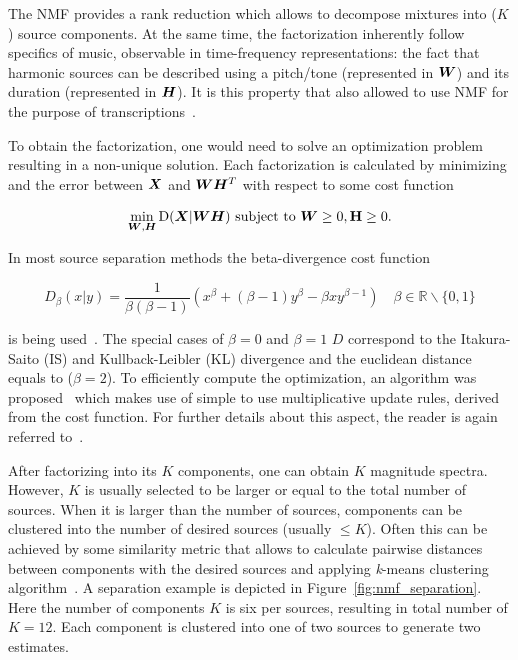 The NMF provides a rank reduction which allows to decompose mixtures into (\(K\)) source components.
At the same time, the factorization inherently follow specifics of music, observable in time-frequency representations: the fact that harmonic sources can be described using a pitch/tone (represented in \({\bm{W}}\)) and its duration (represented in \({\bm{H}}\)).
It is this property that also allowed to use NMF for the purpose of transcriptions~\cite{smaragdis03}.
\par
To obtain the factorization, one would need to solve an optimization problem resulting in a non-unique solution.
Each factorization is calculated by minimizing and the error between \({\bm{X}}\) and \({\bm{W}} {\bm{H}}^{T}\) with respect to some cost function

\begin{equation}
  \min_{{\bm{W}},{\bm{H}}} \mathrm{D}({\bm{X}} | {\bm{W}} {\bm{H}}) \text { subject to } {\bm{W}} \geq 0 , \mathbf {{\bm{H}}} \geq 0.
\end{equation}

In most source separation methods the beta-divergence cost function

\begin{equation}
  D_{\beta} (x | y) = \frac { 1 } { \beta ( \beta - 1 ) } \left( x ^ { \beta } + ( \beta - 1 ) y ^ { \beta } - \beta x y ^ { \beta - 1 } \right) \quad \beta \in \mathbb { R } \backslash \{ 0, 1 \}
\end{equation}

is being used~\cite{fitzgerald08a}. 
The special cases of \(\beta = 0\) and \(\beta = 1\) \(D\) correspond to the Itakura-Saito (IS) and Kullback-Leibler (KL) divergence and the euclidean distance equals to (\(\beta = 2\)).
To efficiently compute the optimization, an algorithm was proposed~\cite{lee01} which makes use of simple to use multiplicative update rules, derived from the cost function.
For further details about this aspect, the reader is again referred to~\cite{cichoki09}.
\par
After factorizing into its \(K\) components, one can obtain \(K\) magnitude spectra.
However, \(K\) is usually selected to be larger or equal to the total number of sources.
When it is larger than the number of sources, components can be clustered into the number of desired sources (usually \(\leq K\)).
Often this can be achieved by some similarity metric that allows to calculate pairwise distances between components with the desired sources and applying \textit{k}-means clustering algorithm~\cite{spiertz09}.
A separation example is depicted in Figure~\ref{fig:nmf_separation}. 
Here the number of components \(K\) is six per sources, resulting in total number of \(K=12\). 
Each component is clustered into one of two sources to generate two estimates.

